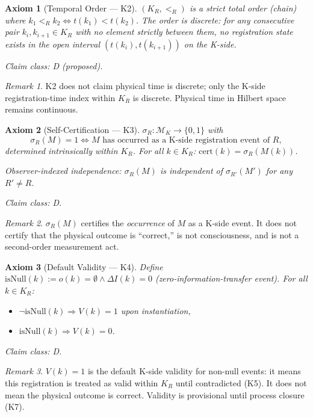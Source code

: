 \documentclass[12pt,a4paper]{article}
\theoremstyle{plain}
\newtheorem{axiom}{Axiom}[section]
\theoremstyle{definition}
\theoremstyle{remark}
\newtheorem{remark}{Remark}[section]
\newcommand{\KR}{K_{\!R}}
\newcommand{\isNull}{\mathrm{isNull}}
\newcommand{\DI}{\Delta I}
\begin{document}
\begin{axiom}[Temporal Order --- K2]\label{ax:K2}
$(\KR,{<_R})$ is a strict total order (chain) where
$k_1 <_R k_2 \iff t(k_1) < t(k_2)$.
The order is \emph{discrete}: for any consecutive pair $k_i, k_{i+1} \in \KR$
with no element strictly between them, no registration state exists in the
open interval $(t(k_i), t(k_{i+1}))$ on the K-side.

\smallskip
\noindent\textit{Claim class}: D (proposed).
\end{axiom}

\begin{remark}
K2 does not claim physical time is discrete; only the K-side
registration-time index within $\KR$ is discrete. Physical time in Hilbert
space remains continuous.
\end{remark}

\begin{axiom}[Self-Certification --- K3]\label{ax:K3}
$\sigma_R\colon \mathcal{M}_K \to \{0,1\}$ with
\[
  \sigma_R(M) = 1 \iff M \text{ has occurred as a K-side registration
  event of }R,
\]
determined \emph{intrinsically} within $\KR$. For all $k \in \KR$:
$\mathrm{cert}(k) = \sigma_R(M(k))$.

\smallskip
\noindent\textit{Observer-indexed independence}:
$\sigma_R(M)$ is independent of $\sigma_{R'}(M')$ for any $R' \neq R$.

\smallskip
\noindent\textit{Claim class}: D.
\end{axiom}

\begin{remark}
$\sigma_R(M)$ certifies the \emph{occurrence} of $M$ as a K-side event.
It does not certify that the physical outcome is ``correct,'' is not
consciousness, and is not a second-order measurement act.
\end{remark}

\begin{axiom}[Default Validity --- K4]\label{ax:K4}
Define $\isNull(k) := o(k) = \emptyset \wedge \DI(k) = 0$
(zero-information-transfer event). For all $k \in \KR$:
\begin{itemize}[noitemsep,topsep=2pt]
  \item[(a)] $\neg\isNull(k) \Rightarrow V(k) = 1$ upon instantiation,
  \item[(b)] $\isNull(k) \Rightarrow V(k) = 0$.
\end{itemize}
\noindent\textit{Claim class}: D.
\end{axiom}

\begin{remark}
$V(k) = 1$ is the default K-side validity for non-null events: it means
this registration is treated as valid within $\KR$ until contradicted (K5).
It does not mean the physical outcome is correct. Validity is provisional
until process closure (K7).
\end{remark}
\end{document}
